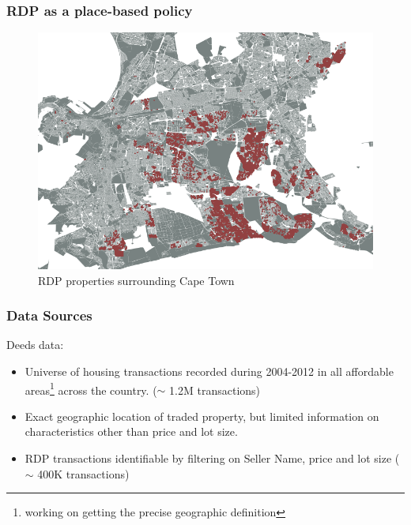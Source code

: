\documentclass[aspectratio=149]{beamer}
\begin{document}

\begin{frame}
\frametitle{RDP as a place-based policy}
\begin{center}
\begin{figure}
\includegraphics[scale=0.33]{map.png}
\caption{RDP properties surrounding Cape Town}
\end{figure}
\end{center}

\end{frame}



\begin{frame}
\frametitle{Data Sources}
Deeds data:
\vspace{2mm}
  \begin{itemize}
    \item Universe of housing transactions recorded during 2004-2012 in all affordable areas\footnote{working on getting the precise geographic definition} across the country. ($\sim$\! 1.2M transactions)
    \vspace{2mm}
    \item Exact geographic location of traded property, but limited information on characteristics other than price and lot size.
    \vspace{2mm}
    \item RDP transactions identifiable by filtering on Seller Name, price and lot size ($\sim$\! 400K transactions)
\end{itemize}
\end{frame}
\end{document}
